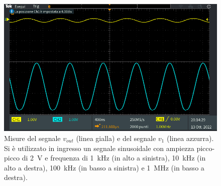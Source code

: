 \begin{figure}[h]
\begin{minipage}{.496\textwidth}
	\end{minipage}
	\begin{minipage}{.496\textwidth}
		\includegraphics[width=\linewidth]{./ImageFiles/Laboratorio 2/TEK00036.PNG}
	\end{minipage}
	\caption{Misure del segnale $v_{out}$ (linea gialla) e del segnale $v_{1}$ (linea azzurra). Si è utilizzato in ingresso un segnale sinusoidale con ampiezza picco-picco di \SI{2}{\volt} e frequenza di \SI{1}{\kilo\hertz} (in alto a sinistra), \SI{10}{\kilo\hertz} (in alto a destra), \SI{100}{\kilo\hertz} (in basso a sinistra) e \SI{1}{\mega\hertz} (in basso a destra).}
	\label{fig:freqseccirc}
\end{figure}

